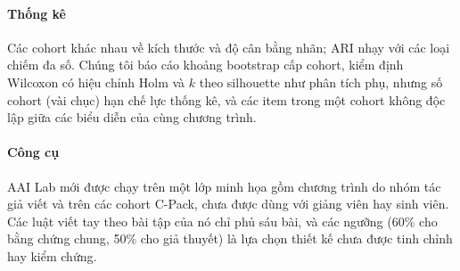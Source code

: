 \paragraph{Thống kê} Các cohort khác nhau về kích thước và độ cân bằng nhãn; ARI nhạy với các loại chiếm đa số. Chúng tôi báo cáo khoảng bootstrap cấp cohort, kiểm định Wilcoxon có hiệu chỉnh Holm và $k$ theo silhouette như phân tích phụ, nhưng số cohort (vài chục) hạn chế lực thống kê, và các item trong một cohort không độc lập giữa các biểu diễn của cùng chương trình.

\paragraph{Công cụ} AAI Lab mới được chạy trên một lớp minh họa gồm chương trình do nhóm tác giả viết và trên các cohort C-Pack, chưa được dùng với giảng viên hay sinh viên. Các luật viết tay theo bài tập của nó chỉ phủ sáu bài, và các ngưỡng (60\% cho bằng chứng chung, 50\% cho giả thuyết) là lựa chọn thiết kế chưa được tinh chỉnh hay kiểm chứng.

